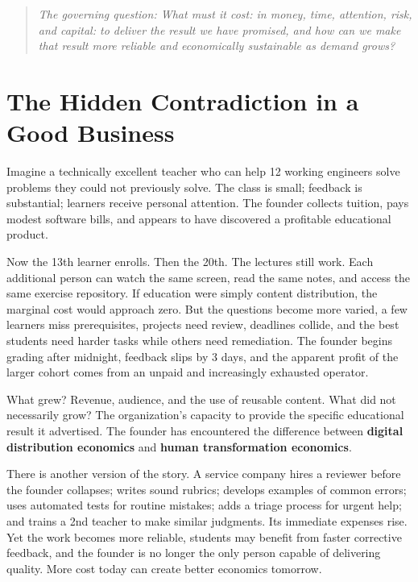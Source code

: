 \begin{quote}
\itshape
The governing question: What must it cost: in money, time, attention, risk, and capital: to deliver the result we have promised, and how can we make that result more reliable and economically sustainable as demand grows?
\end{quote}

\section*{The Hidden Contradiction in a Good Business}

Imagine a technically excellent teacher who can help 12 working engineers solve problems they could not previously solve. The class is small; feedback is substantial; learners receive personal attention. The founder collects tuition, pays modest software bills, and appears to have discovered a profitable educational product.

Now the 13th learner enrolls. Then the 20th. The lectures still work. Each additional person can watch the same screen, read the same notes, and access the same exercise repository. If education were simply content distribution, the marginal cost would approach zero. But the questions become more varied, a few learners miss prerequisites, projects need review, deadlines collide, and the best students need harder tasks while others need remediation. The founder begins grading after midnight, feedback slips by 3 days, and the apparent profit of the larger cohort comes from an unpaid and increasingly exhausted operator.

What grew? Revenue, audience, and the use of reusable content. What did not necessarily grow? The organization's capacity to provide the specific educational result it advertised. The founder has encountered the difference between \textbf{digital distribution economics} and \textbf{human transformation economics}.

There is another version of the story. A service company hires a reviewer before the founder collapses; writes sound rubrics; develops examples of common errors; uses automated tests for routine mistakes; adds a triage process for urgent help; and trains a 2nd teacher to make similar judgments. Its immediate expenses rise. Yet the work becomes more reliable, students may benefit from faster corrective feedback, and the founder is no longer the only person capable of delivering quality. More cost today can create better economics tomorrow.

